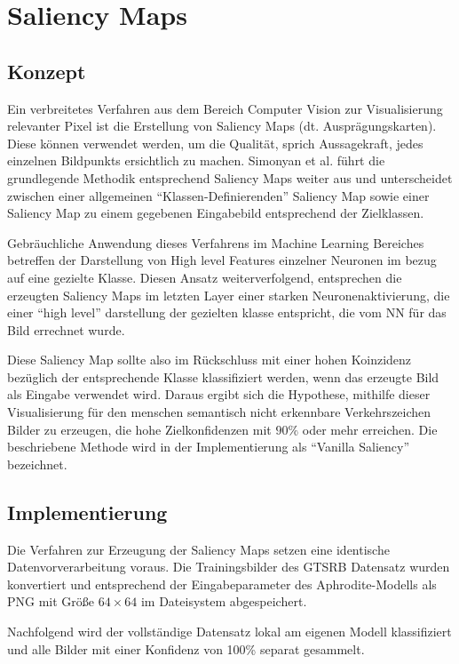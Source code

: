 \chapter{Saliency Maps}
\label{cha:saliency}

\section{Konzept}
Ein verbreitetes Verfahren aus dem Bereich Computer Vision zur Visualisierung relevanter Pixel ist die Erstellung von Saliency Maps (dt. Ausprägungskarten). Diese können verwendet werden, um die Qualität, sprich Aussagekraft, jedes einzelnen Bildpunkts ersichtlich zu machen. Simonyan et al. \cite{simonyan_deep_2013} führt die grundlegende Methodik entsprechend Saliency Maps weiter aus und unterscheidet zwischen einer allgemeinen “Klassen-Definierenden” Saliency Map sowie einer Saliency Map zu einem gegebenen Eingabebild entsprechend der Zielklassen.


Gebräuchliche Anwendung dieses Verfahrens im Machine Learning Bereiches betreffen der Darstellung von High level Features einzelner Neuronen \cite{liu_delving_2016} im bezug auf eine gezielte Klasse. Diesen Ansatz weiterverfolgend, entsprechen die erzeugten Saliency Maps im letzten Layer einer starken Neuronenaktivierung, die einer “high level” darstellung der gezielten klasse entspricht, die vom NN für das Bild errechnet wurde. 


Diese Saliency Map sollte also im Rückschluss mit einer hohen Koinzidenz bezüglich der entsprechende Klasse klassifiziert werden, wenn das erzeugte Bild als Eingabe verwendet wird. Daraus ergibt sich die Hypothese, mithilfe dieser Visualisierung für den menschen semantisch nicht erkennbare Verkehrszeichen Bilder zu erzeugen, die hohe Zielkonfidenzen mit $90\%$ oder mehr erreichen. Die beschriebene Methode wird in der Implementierung als “Vanilla Saliency” bezeichnet.

\section{Implementierung}

Die Verfahren zur Erzeugung der Saliency Maps setzen eine identische Datenvorverarbeitung voraus. 
Die Trainingsbilder des GTSRB Datensatz wurden konvertiert und entsprechend der Eingabeparameter des Aphrodite-Modells als PNG mit Größe $64 \times 64 $ im Dateisystem abgespeichert.

Nachfolgend wird der vollständige Datensatz lokal am eigenen Modell klassifiziert und alle Bilder mit einer Konfidenz von 100\% separat gesammelt. 


